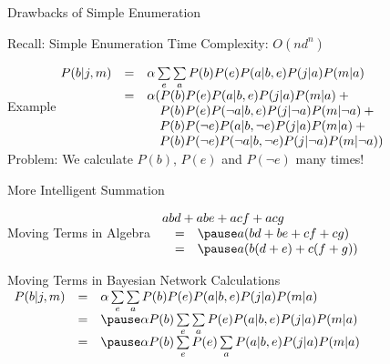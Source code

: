 \documentclass[14pt]{beamer}
\begin{document}
\begin{frame}{Drawbacks of Simple Enumeration}
	\begin{block}{Recall: Simple Enumeration}
		Time Complexity: $O(nd^{n})$
	\end{block}
	\pause
	\begin{block}{Example}
		$
		\begin{array}{@{}lll@{}}
		P(b|j,m) & = & \alpha\sum\limits_{e}\sum\limits_{a}P(b)P(e)P(a|b,e)P(j|a)P(m|a) \\
		         & = & \alpha(P(b)P(e)P(a|b,e)P(j|a)P(m|a) + \mbox{}\\
		         &   &   \tab P(b)P(e)P(\lnot a|b,e)P(j|\lnot a)P(m|\lnot a) + \mbox{}\\
		         &   &   \tab P(b)P(\lnot e)P(a|b,\lnot e)P(j|a)P(m|a) + \mbox{}\\
		         &   &   \tab P(b)P(\lnot e)P(\lnot a|b,\lnot e)P(j|\lnot a)P(m|\lnot a))
		\end{array}
		$
		\\
		\medskip
		\pause Problem: \pause We calculate $P(b)$, $P(e)$ and $P(\lnot e)$ many times!
	\end{block}
\end{frame}

\begin{frame}{More Intelligent Summation}
	\begin{block}{Moving Terms in Algebra}
		$
		\begin{array}{lll}
		\lefteqn{abd + abe + acf + acg} \\
		   & = & \pause a(bd + be + cf + cg) \\
		   & = & \pause a(b(d + e) + c(f + g)) \\
		\end{array}
		$
	\end{block}
	\pause
	\begin{block}{Moving Terms in Bayesian Network Calculations}
		$
		\begin{array}{lll}
		P(b|j,m) & = & \alpha\sum\limits_{e}\sum\limits_{a}P(b)P(e)P(a|b,e)P(j|a)P(m|a) \\
		         & = & \pause
		               \alpha P(b)\sum\limits_{e}\sum\limits_{a}P(e)P(a|b,e)P(j|a)P(m|a) \\
		         & = & \pause
		               \alpha P(b)\sum\limits_{e}P(e)\sum\limits_{a}P(a|b,e)P(j|a)P(m|a)
		\end{array}
		$
	\end{block}
\end{frame}
\end{document}
